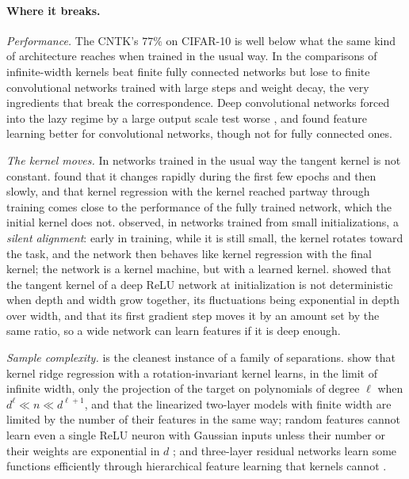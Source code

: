 \begin{refsection}
\paragraph{Where it breaks.} \emph{Performance.} The CNTK's $77\%$ on CIFAR-10 \parencite{AroraEtAl2019a} is well below what the same kind of architecture reaches when trained in the usual way. In the comparisons of \textcite{LeeEtAl2020} infinite-width kernels beat finite fully connected networks but lose to finite convolutional networks trained with large steps and weight decay, the very ingredients that break the correspondence. Deep convolutional networks forced into the lazy regime by a large output scale test worse \parencite{ChizatEtAl2019}, and \textcite{GeigerEtAl2020} found feature learning better for convolutional networks, though not for fully connected ones.

\emph{The kernel moves.} In networks trained in the usual way the tangent kernel is not constant. \Textcite{FortEtAl2020} found that it changes rapidly during the first few epochs and then slowly, and that kernel regression with the kernel reached partway through training comes close to the performance of the fully trained network, which the initial kernel does not. \Textcite{AtanasovEtAl2022} observed, in networks trained from small initializations, a \emph{silent alignment}: early in training, while it is still small, the kernel rotates toward the task, and the network then behaves like kernel regression with the final kernel; the network is a kernel machine, but with a learned kernel. \Textcite{HaninNica2020} showed that the tangent kernel of a deep ReLU network at initialization is not deterministic when depth and width grow together, its fluctuations being exponential in depth over width, and that its first gradient step moves it by an amount set by the same ratio, so a wide network can learn features if it is deep enough.

\emph{Sample complexity.}  is the cleanest instance of a family of separations. \Textcite{GhorbaniEtAl2021} show that kernel ridge regression with a rotation-invariant kernel learns, in the limit of infinite width, only the projection of the target on polynomials of degree $\ell$ when $d^\ell\ll n\ll d^{\ell+1}$, and that the linearized two-layer models with finite width are limited by the number of their features in the same way; random features cannot learn even a single ReLU neuron with Gaussian inputs unless their number or their weights are exponential in $d$ \parencite{YehudaiShamir2019}; and three-layer residual networks learn some functions efficiently through hierarchical feature learning that kernels cannot \parencite{AllenZhuLi2019}.


\end{refsection}
